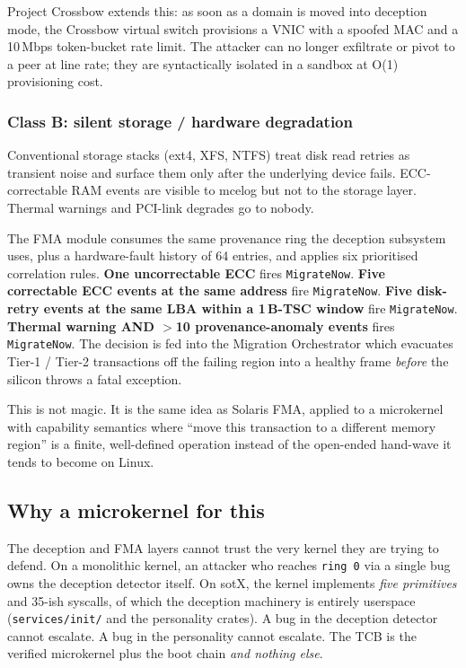 \documentclass[11pt,a4paper]{article}
\begin{document}
Project Crossbow extends this: as soon as a domain is moved into
deception mode, the Crossbow virtual switch provisions a VNIC with a
spoofed MAC and a 10\,Mbps token-bucket rate limit. The attacker can
no longer exfiltrate or pivot to a peer at line rate; they are
syntactically isolated in a sandbox at O(1) provisioning cost.

\subsubsection*{Class B: silent storage / hardware degradation}

Conventional storage stacks (ext4, XFS, NTFS) treat disk read retries
as transient noise and surface them only after the underlying device
fails. ECC-correctable RAM events are visible to mcelog but not to the
storage layer. Thermal warnings and PCI-link degrades go to nobody.

The FMA module consumes the same provenance ring the deception
subsystem uses, plus a hardware-fault history of 64 entries, and
applies six prioritised correlation rules. \textbf{One uncorrectable
ECC} fires \texttt{MigrateNow}. \textbf{Five correctable ECC events at
the same address} fire \texttt{MigrateNow}. \textbf{Five disk-retry
events at the same LBA within a 1\,B-TSC window} fire
\texttt{MigrateNow}. \textbf{Thermal warning AND $>$10
provenance-anomaly events} fires \texttt{MigrateNow}. The decision is
fed into the Migration Orchestrator which evacuates Tier-1 / Tier-2
transactions off the failing region into a healthy frame
\emph{before} the silicon throws a fatal exception.

This is not magic. It is the same idea as Solaris FMA, applied to a
microkernel with capability semantics where ``move this transaction
to a different memory region'' is a finite, well-defined operation
instead of the open-ended hand-wave it tends to become on Linux.

\subsection{Why a microkernel for this}

The deception and FMA layers cannot trust the very kernel they are
trying to defend. On a monolithic kernel, an attacker who reaches
\texttt{ring~0} via a single bug owns the deception detector itself.
On sotX, the kernel implements \emph{five primitives} and 35-ish
syscalls, of which the deception machinery is entirely userspace
(\texttt{services/init/} and the personality crates). A bug in the
deception detector cannot escalate. A bug in the personality cannot
escalate. The TCB is the verified microkernel plus the boot chain
\emph{and nothing else}.
\end{document}
